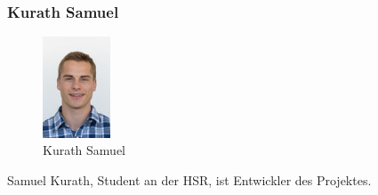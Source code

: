 \subsubsection{Kurath Samuel}
\noindent\begin{minipage}{0.5\textwidth}
\begin{figure}[H]
	\centering
	\includegraphics[height=30mm]{images/skurath.jpg}
	\caption{Kurath Samuel}
\end{figure}
\end{minipage}
\hfill
\begin{minipage}{0.5\textwidth}
Samuel Kurath, Student an der HSR, ist Entwickler des Projektes. \\
\end{minipage}